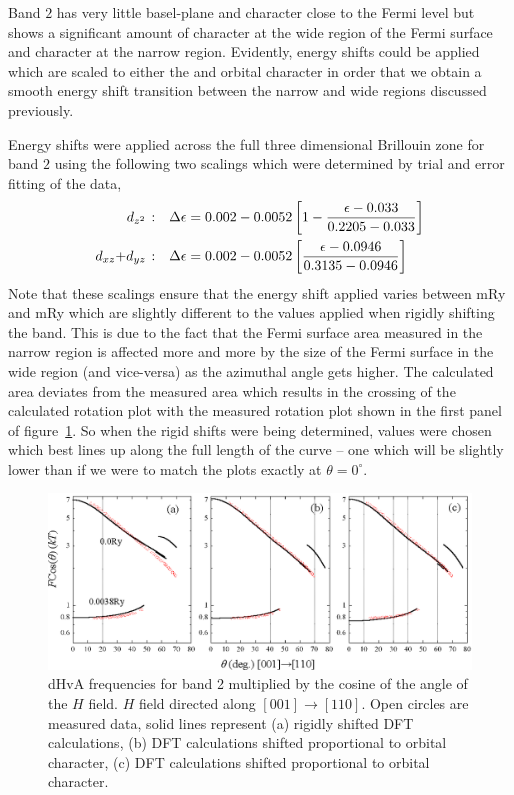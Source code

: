 Band $2$ has very little basel-plane \Dxy and \DxTwoyTwo character close to the Fermi level but shows a significant amount of \DzTwo character at the wide region of the Fermi surface and \DxzDyz character at the narrow region. Evidently, energy shifts could be applied which are scaled to either the \DzTwo and \DxzDyz orbital character in order that we obtain a smooth energy shift transition between the narrow and wide regions discussed previously. 

Energy shifts were applied across the full three dimensional Brillouin zone for band $2$ using the following two scalings which were determined by trial and error fitting of the data,
\begin{align*}
\textrm{\DzTwo:}\quad \Delta\epsilon &= 0.002 - 0.0052 \left[1 - \frac{\epsilon - 0.033}{0.2205 - 0.033}\right] \\
\textrm{\DxzDyz:}\quad \Delta\epsilon &= 0.002 - 0.0052 \left[\frac{\epsilon - 0.0946}{0.3135 - 0.0946}\right]
\end{align*}
Note that these scalings ensure that the energy shift applied varies between \unit[-32]{mRy} and \unit[2]{mRy} which are slightly different to the values applied when rigidly shifting the band. This is due to the fact that the Fermi surface area measured in the narrow region is affected more and more by the size of the Fermi surface in the wide region (and vice-versa) as the azimuthal angle gets higher. The calculated area deviates from the measured area which results in the crossing of the calculated rotation plot with the measured rotation plot shown in the first panel of figure~\ref{Fig:ResD:Band2DCharacterRigidComparison}. So when the rigid shifts were being determined, values were chosen which best lines up along the full length of the curve -- one which will be slightly lower than if we were to match the plots exactly at $\theta=0^\circ$.

\begin{figure}[htbp]
    \begin{center}
        \includegraphics[scale=0.8]{Chapter-dHvABaFe2P2/Figures/AngleDepMeasurements/BandCharacterRotPlot/Band2_110_RotPlot_Comparison}
        \caption{dHvA frequencies for band 2 multiplied by the cosine of the angle of the $H$ field. $H$ field directed along $[001]\rightarrow[110]$. Open circles are measured data, solid lines represent (a) rigidly shifted \ac{DFT} calculations, (b) \ac{DFT} calculations shifted proportional to \DzTwo orbital character, (c) \ac{DFT} calculations shifted proportional to \DxzDyz orbital character.}
        \label{Fig:ResD:Band2DCharacterRigidComparison}
    \end{center}
\end{figure}

